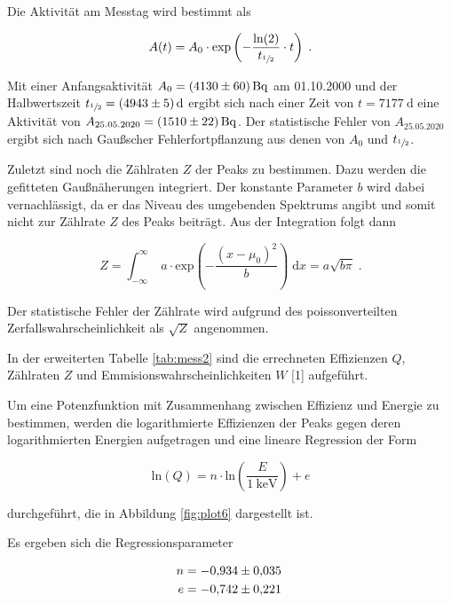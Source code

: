 Die Aktivität am Messtag wird bestimmt als

\begin{equation}
  A(t) = A_0 \cdot \text{exp} \left(- \frac{\text{ln}(2)}{t_{\sfrac{1}{2}}} \cdot t \right)  \; .
\end{equation}

Mit einer Anfangsaktivität $A_0 = \SI{4130 +- 60}{\becquerel}$ am 01.10.2000 und der Halbwertszeit
$t_{\sfrac{1}{2}} = \SI{4943 +- 5}{\day}$ ergibt sich nach einer Zeit von $t = \SI{7177}{\day}$
eine Aktivität von $A_{25.05.2020} = \SI{1510 +- 22}{\becquerel}$.
Der statistische Fehler von $A_{25.05.2020}$ ergibt sich nach 
Gaußscher Fehlerfortpflanzung aus denen von $A_0$ und $t_{\sfrac{1}{2}}$.

Zuletzt sind noch die Zählraten $Z$ der Peaks zu bestimmen. Dazu werden die gefitteten Gaußnäherungen integriert. 
Der konstante Parameter $b$ wird dabei vernachlässigt, da er das Niveau des umgebenden Spektrums angibt und somit nicht zur 
Zählrate $Z$ des Peaks beiträgt. Aus der Integration folgt dann

\begin{equation}
  Z = \int_{-\infty}^\infty \; a \cdot \text{exp}\left( - \frac{(x-\mu_0)^2}{b}\right) \; \text{d}x = a \sqrt{b\pi} \; .
  \label{eqn:rate}
\end{equation}

Der statistische Fehler der Zählrate wird aufgrund des poissonverteilten Zerfallswahrscheinlichkeit als $\sqrt{Z}$ angenommen.

In der erweiterten Tabelle \ref{tab:mess2} sind die errechneten Effizienzen $Q$, Zählraten $Z$ und 
Emmisionswahrscheinlichkeiten $W$ [1] aufgeführt.

Um eine Potenzfunktion mit Zusammenhang zwischen Effizienz und Energie zu bestimmen,
werden die logarithmierte Effizienzen der Peaks gegen deren logarithmierten Energien aufgetragen und eine
lineare Regression der Form

\begin{equation}
  \text{ln}(Q) = n \cdot \text{ln}(\frac{E}{\SI{1}{\kilo\eV}}) + e
\end{equation}

durchgeführt, die in Abbildung \ref{fig:plot6} dargestellt ist.

Es ergeben sich die Regressionsparameter

\begin{align*}
  n &= \num{-0.934 +- 0.035} \\
  e &= \num{-0.742 +- 0.221} \; 
\end{align*}

